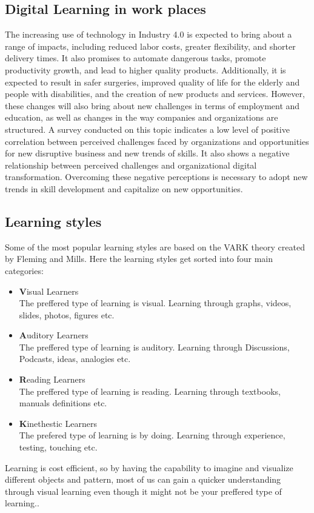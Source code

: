\subsection{Digital Learning in work places}\label{ch:digitalLearningWorkPlaces}

The increasing use of technology in Industry 4.0 is expected to bring about a range of impacts, including reduced labor costs, greater flexibility, and shorter delivery times. It also promises to automate dangerous tasks, promote productivity growth, and lead to higher quality products.
Additionally, it is expected to result in safer surgeries, improved quality of life for the elderly and people with disabilities, and the creation of new products and services. However, these changes will also bring about new challenges in terms of employment and education, as well as changes in the way companies and organizations are structured.
A survey conducted on this topic indicates a low level of positive correlation between perceived challenges faced by organizations and opportunities for new disruptive business and new trends of skills.
It also shows a negative relationship between perceived challenges and organizational digital transformation. Overcoming these negative perceptions is necessary to adopt new trends in skill development and capitalize on new opportunities.\cite{SkillsDigitalLearning}
\subsection{Learning styles}\label{ch:learningStyles}
Some of the most popular learning styles are based on the VARK theory\cite{vark} created by Fleming and Mills. Here the learning styles get sorted into four main categories:
\begin{itemize}
\item \textbf{V}isual Learners \\
The preffered type of learning is visual. Learning through graphs, videos, slides, photos, figures etc.
\item \textbf{A}uditory Learners\\
The preffered type of learning is auditory. Learning through Discussions, Podcasts, ideas, analogies etc.
\item \textbf{R}eading Learners\\
The preffered type of learning is reading. Learning through textbooks, manuals definitions etc.
\item \textbf{K}inethestic Learners \\
The prefered type of learning is by doing. Learning through experience, testing, touching etc.
\end{itemize}
Learning is cost efficient, so by having the capability to imagine and visualize different objects and pattern, most of us can gain a quicker understanding through visual learning even though it might not be your preffered type of learning.\cite{pracpsych2022}.

